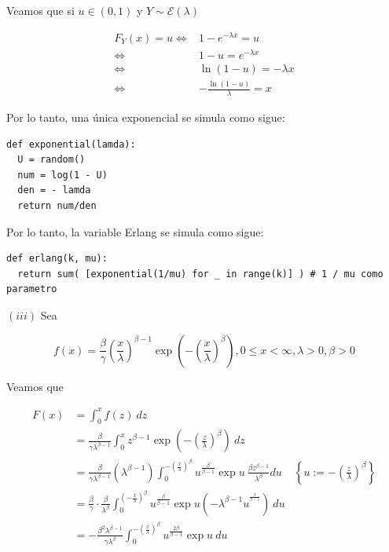 \documentclass[a4paper, 12pt]{article}
\begin{document}
Veamos que si $u \in (0, 1)$ y $Y \sim \mathcal{E}(\lambda)$

\begin{align*}
  F_Y(x) = u 
  \iff& 1 -e^{-\lambda x} = u\\ 
  \iff&1-u = e^{-\lambda x} \\ 
  \iff& \ln(1-u) = -\lambda x \\ 
  \iff&-\frac{\ln(1-u)}{\lambda} = x
\end{align*}

Por lo tanto, una única exponencial se simula como sigue:
\footnotesize
\begin{verbatim}
def exponential(lamda):
  U = random()
  num = log(1 - U)
  den = - lamda 
  return num/den
\end{verbatim}
\normalsize
Por lo tanto, la variable Erlang se simula como sigue:

\footnotesize
\begin{verbatim}
def erlang(k, mu):
  return sum( [exponential(1/mu) for _ in range(k)] ) # 1 / mu como parametro
\end{verbatim}
\normalsize

$(iii)$ Sea

\begin{equation*}
    f(x) = \frac{\beta}{\gamma}\left(\frac{x}{\lambda}\right)^{\beta - 1}\exp\left(
    -\left( \frac{x}{\lambda} \right)^\beta \right), 0\leq x < \infty, \lambda > 0, \beta
    > 0
\end{equation*}

Veamos que 

\begin{align*}
  F(x) 
  &=\int_0^x f(z) ~ dz \\ 
  &=\frac{\beta}{\gamma\lambda^{\beta-1}}\int_0^x z^{\beta - 1} \exp\left(
  -\left( \frac{z}{\lambda} \right)^{\beta}  \right)  ~ dz \\ 
  &=\frac{\beta}{\gamma\lambda^{\beta-1}}\left( \lambda^{\beta - 1} \right) \int_0^{-(\frac{x}{\lambda})^\beta} 
  u^{\frac{\beta}{\beta-1}} \exp u ~  \frac{\beta z^{\beta-1}}{\lambda^\beta}
  du &\left\{ u := -\left(\frac{z}{\lambda}\right)^\beta \right\}  \\ 
     &=\frac{\beta}{\gamma}\cdot \frac{\beta}{\lambda^\beta}\int_0^{(-\frac{x}{\lambda})^\beta}
     u^{\frac{\beta}{\beta - 1}} \exp u \left( -\lambda^{\beta-1}
     u^{^\frac{\beta}{\beta - 1}} \right) ~ du \\ 
     &=-\frac{\beta^2\lambda^{\beta - 1}}{\gamma \lambda^\beta}\int_0^{-(
     \frac{x}{\lambda} )^\beta} u^{\frac{2\beta}{\beta - 1}} \exp u ~ du
\end{align*}
\end{document}
